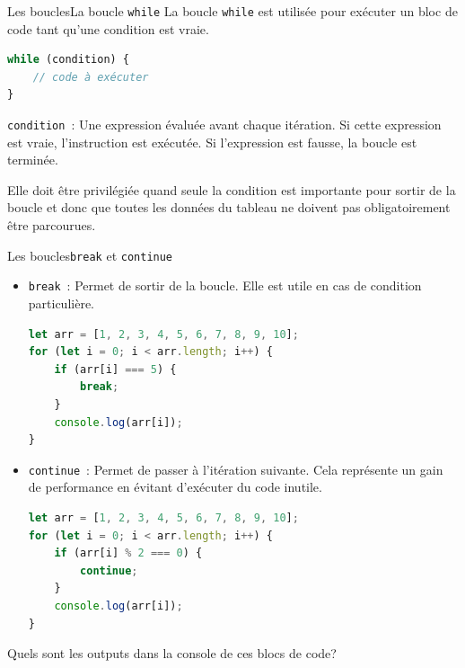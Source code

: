 \documentclass{beamer}
\begin{document}
    \begin{frame}[fragile]{Les boucles}{La boucle \lstinline{while}}
        La boucle \lstinline{while} est utilisée pour exécuter un bloc de code tant qu'une condition est vraie.
        \begin{lstlisting}[language=JavaScript,title={\tiny{Script JavaScript}}]
while (condition) {
    // code à exécuter
}
        \end{lstlisting}
        \lstinline{condition}~: Une expression évaluée avant chaque itération.
        Si cette expression est vraie, l'instruction est exécutée.
        Si l'expression est fausse, la boucle est terminée.
        \begin{dangercolorbox}
            Elle doit être privilégiée quand seule la condition est importante pour sortir de la boucle et donc que toutes les données du tableau ne doivent pas obligatoirement être parcourues.
        \end{dangercolorbox}
    \end{frame}

    \begin{frame}[fragile]{Les boucles}{\lstinline{break} et \lstinline{continue}}
        \begin{footnotesize}
            \begin{itemize}
                \item \lstinline{break}~: Permet de sortir de la boucle.
                Elle est utile en cas de condition particulière.
                \begin{lstlisting}[language=JavaScript,title={\tiny{Script JavaScript}},basicstyle=\tiny\ttfamily]
let arr = [1, 2, 3, 4, 5, 6, 7, 8, 9, 10];
for (let i = 0; i < arr.length; i++) {
    if (arr[i] === 5) {
        break;
    }
    console.log(arr[i]);
}
                \end{lstlisting}
                \item \lstinline{continue}~: Permet de passer à l'itération suivante.
                Cela représente un gain de performance en évitant d'exécuter du code inutile.
                \begin{lstlisting}[language=JavaScript,title={\tiny{Script JavaScript}},basicstyle=\tiny\ttfamily]
let arr = [1, 2, 3, 4, 5, 6, 7, 8, 9, 10];
for (let i = 0; i < arr.length; i++) {
    if (arr[i] % 2 === 0) {
        continue;
    }
    console.log(arr[i]);
}
                \end{lstlisting}
            \end{itemize}
        \end{footnotesize}
        Quels sont les outputs dans la console de ces blocs de code?
    \end{frame}
\end{document}
